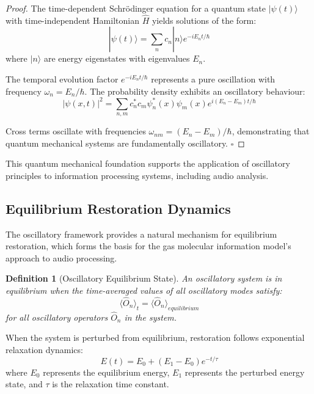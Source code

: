 \documentclass[12pt,a4paper]{article}
\newtheorem{definition}{Definition}
\begin{document}
\begin{proof}
The time-dependent Schrödinger equation for a quantum state $|\psi(t)\rangle$ with time-independent Hamiltonian $\hat{H}$ yields solutions of the form:
\begin{equation}
|\psi(t)\rangle = \sum_n c_n |n\rangle e^{-iE_n t/\hbar}
\end{equation}
where $|n\rangle$ are energy eigenstates with eigenvalues $E_n$.

The temporal evolution factor $e^{-iE_n t/\hbar}$ represents a pure oscillation with frequency $\omega_n = E_n/\hbar$. The probability density exhibits an oscillatory behaviour:
\begin{equation}
|\psi(x,t)|^2 = \sum_{n,m} c_n^* c_m \psi_n^*(x) \psi_m(x) e^{i(E_n - E_m)t/\hbar}
\end{equation}

Cross terms oscillate with frequencies $\omega_{nm} = (E_n - E_m)/\hbar$, demonstrating that quantum mechanical systems are fundamentally oscillatory. $\square$
\end{proof}

This quantum mechanical foundation supports the application of oscillatory principles to information processing systems, including audio analysis.

\subsection{Equilibrium Restoration Dynamics}

The oscillatory framework provides a natural mechanism for equilibrium restoration, which forms the basis for the gas molecular information model's approach to audio processing.

\begin{definition}[Oscillatory Equilibrium State]
An oscillatory system is in equilibrium when the time-averaged values of all oscillatory modes satisfy:
\begin{equation}
\langle\hat{O}_n\rangle_t = \langle\hat{O}_n\rangle_{equilibrium}
\end{equation}
for all oscillatory operators $\hat{O}_n$ in the system.
\end{definition}

When the system is perturbed from equilibrium, restoration follows exponential relaxation dynamics:
\begin{equation}
E(t) = E_0 + (E_1 - E_0) e^{-t/\tau}
\end{equation}
where $E_0$ represents the equilibrium energy, $E_1$ represents the perturbed energy state, and $\tau$ is the relaxation time constant.
\end{document}
